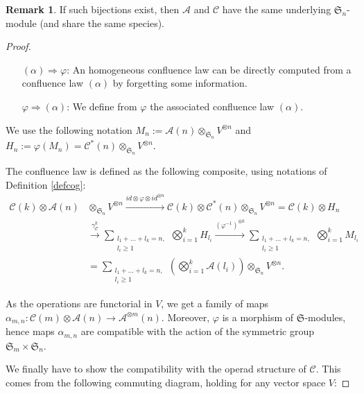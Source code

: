 \documentclass[11pt,leqno]{amsart}
\theoremstyle{definition}
\newtheorem{remark}[definition]{Remark}
\theoremstyle{plain}
\newcommand{\A}{ \mathcal{A} }
\newcommand{\C}{ \mathcal{C} }
\begin{document}
\begin{remark}
If such bijections exist, then $\A$ and $\C$ have the same underlying $\mathfrak{S}_n$-module (and share the same species).
\end{remark}

\begin{proof} 

\begin{itemize}
\item[$ (\alpha) \Rightarrow \varphi$:] An homogeneous confluence law can be directly computed from a confluence law $(\alpha)$ by forgetting some information.

\item[ $\varphi \Rightarrow (\alpha)$:] 
We define from $\varphi$ the associated confluence law $(\alpha)$.
\end{itemize}
We use the following notation $M_n:=\mathcal{A}(n) \otimes_{\mathfrak{S}_n} V^{\otimes n}$ and $H_n:=\varphi(M_n)=\mathcal{C}^*(n) \otimes_{\mathfrak{S}_n} V^{\otimes n}$. 


The confluence law is defined as the following composite, using notations of Definition \ref{defcog}:
\begin{align*}
\mathcal{C}(k) \otimes \mathcal{A}(n) &\otimes_{\mathfrak{S}_n}  V^{\otimes n} \xrightarrow{id \otimes \varphi \otimes id^{\otimes n}} \mathcal{C}(k) \otimes \mathcal{C}^*(n) \otimes_{\mathfrak{S}_n} V^{\otimes n} = \mathcal{C}(k) \otimes H_n \\
&\xrightarrow{\gamma^k_\C} 
\sum_{\substack{l_1+\ldots+l_k=n,\\ l_i \geq 1}} \bigotimes_{i=1}^k H_{l_i}  \xrightarrow{(\varphi^{-1})^{\otimes k}} \sum_{\substack{l_1+\ldots+l_k=n,\\ l_i \geq 1}} \bigotimes_{i=1}^k M_{l_i} \\&= \sum_{\substack{l_1+\ldots+l_k=n,\\ l_i \geq 1}} \left( \bigotimes_{i=1}^k \mathcal{A}(l_i) \right) \otimes_{\mathfrak{S}_n} V^{\otimes n}.
\end{align*}

As the operations are functorial in $V$, we get a family of maps $\alpha_{m,n} : \C(m) \otimes \A(n) \rightarrow \A^{\otimes m}(n)$. Moreover, $\varphi$ is a morphism of $\mathfrak{S}$-modules, hence maps $\alpha_{m,n}$ are compatible with the action of the symmetric group $\mathfrak{S}_m \times \mathfrak{S}_n$.

We finally have to show the compatibility with the operad structure of $\C$. This comes from the following commuting diagram, holding for any vector space $V$:


\end{proof}
\end{document}
